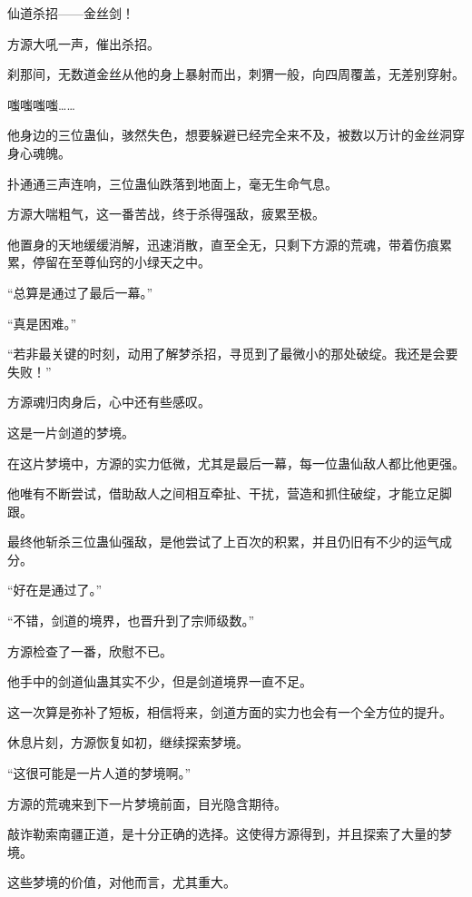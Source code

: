 
\begin{this_body}



仙道杀招——金丝剑！

方源大吼一声，催出杀招。

刹那间，无数道金丝从他的身上暴射而出，刺猬一般，向四周覆盖，无差别穿射。

嗤嗤嗤嗤……

他身边的三位蛊仙，骇然失色，想要躲避已经完全来不及，被数以万计的金丝洞穿身心魂魄。

扑通通三声连响，三位蛊仙跌落到地面上，毫无生命气息。

方源大喘粗气，这一番苦战，终于杀得强敌，疲累至极。

他置身的天地缓缓消解，迅速消散，直至全无，只剩下方源的荒魂，带着伤痕累累，停留在至尊仙窍的小绿天之中。

“总算是通过了最后一幕。”

“真是困难。”

“若非最关键的时刻，动用了解梦杀招，寻觅到了最微小的那处破绽。我还是会要失败！”

方源魂归肉身后，心中还有些感叹。

这是一片剑道的梦境。

在这片梦境中，方源的实力低微，尤其是最后一幕，每一位蛊仙敌人都比他更强。

他唯有不断尝试，借助敌人之间相互牵扯、干扰，营造和抓住破绽，才能立足脚跟。

最终他斩杀三位蛊仙强敌，是他尝试了上百次的积累，并且仍旧有不少的运气成分。

“好在是通过了。”

“不错，剑道的境界，也晋升到了宗师级数。”

方源检查了一番，欣慰不已。

他手中的剑道仙蛊其实不少，但是剑道境界一直不足。

这一次算是弥补了短板，相信将来，剑道方面的实力也会有一个全方位的提升。

休息片刻，方源恢复如初，继续探索梦境。

“这很可能是一片人道的梦境啊。”

方源的荒魂来到下一片梦境前面，目光隐含期待。

敲诈勒索南疆正道，是十分正确的选择。这使得方源得到，并且探索了大量的梦境。

这些梦境的价值，对他而言，尤其重大。


\end{this_body}
